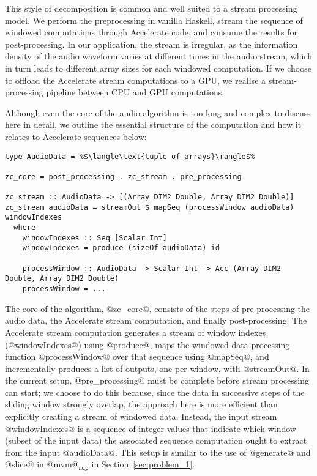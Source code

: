 This style of decomposition is common and well suited to a stream processing model. We perform the preprocessing in vanilla Haskell, stream the sequence of windowed computations through Accelerate code, and consume the results for post-processing. In our application, the stream is irregular, as the information density of the audio waveform varies at different times in the audio stream, which in turn leads to different array sizes for each windowed computation. If we choose to offload the Accelerate stream computations to a GPU, we realise a stream-processing pipeline between CPU and GPU computations.

Although even the core of the audio algorithm is too long and complex to discuss here in detail, we outline the essential structure of the computation and how it relates to Accelerate sequences below:
%
\begin{lstlisting}
type AudioData = %$\langle\text{tuple of arrays}\rangle$%

zc_core = post_processing . zc_stream . pre_processing

zc_stream :: AudioData -> [(Array DIM2 Double, Array DIM2 Double)]
zc_stream audioData = streamOut $ mapSeq (processWindow audioData) windowIndexes
  where
    windowIndexes :: Seq [Scalar Int]
    windowIndexes = produce (sizeOf audioData) id

    processWindow :: AudioData -> Scalar Int -> Acc (Array DIM2 Double, Array DIM2 Double)
    processWindow = ...
\end{lstlisting}
%
The core of the algorithm, @zc_core@, consists of the steps of pre-processing the audio data, the Accelerate stream computation, and finally post-processing. The Accelerate stream computation generates a stream of window indexes (@windowIndexes@) using @produce@, maps the windowed data processing function @processWindow@ over that sequence using @mapSeq@, and incrementally produces a list of outputs, one per window, with @streamOut@. In the current setup, @pre_processing@ must be complete before stream processing can start; we choose to do this because, since the data in successive steps of the sliding window strongly overlap, the approach here is more efficient than explicitly creating a stream of windowed data. Instead, the input stream @windowIndexes@ is a sequence of integer values that indicate which window (subset of the input data) the associated sequence computation ought to extract from the input @audioData@. This setup is similar to the use of @generate@ and @slice@ in @mvm@$_{\texttt{ndp}}$ in Section~\ref{sec:problem_1}.

